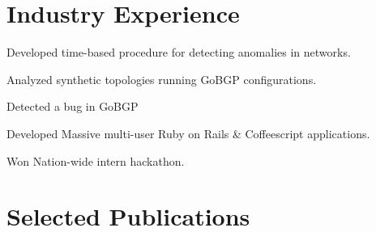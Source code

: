 \documentclass[]{deedy-resume-openfont}
\begin{document}
\begin{minipage}[t]{0.66\textwidth} 


\section{Industry Experience}

\vspace{\topsep}
\begin{tightemize}
\item Developed time-based procedure for detecting anomalies in networks.
\item Analyzed synthetic topologies running GoBGP configurations.
\item Detected a bug in GoBGP
\end{tightemize}
 \sectionsep
{}
\begin{tightemize}
  \item Developed Massive multi-user Ruby on Rails \& Coffeescript applications.
  \item Won Nation-wide intern hackathon.
\end{tightemize}
\sectionsep



\section{Selected Publications}



\end{minipage}
\end{document}

